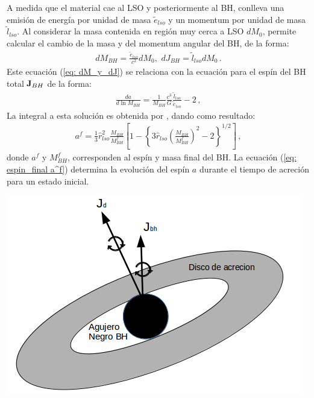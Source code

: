 A medida que el material cae al LSO y posteriormente al BH, conlleva  una emisión de energía por unidad de masa $\widetilde{e}_{lso}$ y un momentum por unidad de masa $\widetilde{l}_{lso}$. Al considerar la masa contenida en región muy cerca a LSO $dM_{0}$, permite calcular el cambio de la masa y del momentum angular del BH, de la forma:
%
\begin{align}
    dM_{BH}=\frac{\widetilde{e}_{lso}}{c^{2}}dM_{0}, \, \, dJ_{BH}=\widetilde{l}_{lso}dM_{0}\,.
    \label{eq: dM_y_dJ}
\end{align}
%
Este ecuación (\ref{eq: dM_y_dJ}) se relaciona con la ecuación para el espín del BH total ${\bf{J}}_{BH}$ de la forma:
%
\begin{align}
    \frac{da}{d\ln{M_{BH}}}=\frac{1}{M_{BH}}\frac{c^{3}}{G}\frac{\widetilde{l}_{lso}}{\widetilde{e}_{lso}}-2\,,
\end{align}
%
La integral a esta solución es obtenida por \cite{bardeen1970}, dando como resultado: 
\begin{align}
    a^{f}=\frac{1}{3}\hat{r}_{lso}^{2}\frac{M_{BH}}{M_{BH}^{f}}\left[1- \left\{3\hat{r}_{lso}\left(\frac{M_{BH}}{M^{f}_{BH}} \right)^{2}-2 \right\}^{1/2} \right]\,,
    \label{eq: espin_final a^f}
\end{align}
donde $a^{f}$ y $M_{BH}^{f}$, corresponden al espín y masa final del BH. La ecuación (\ref{eq: espin_final a^f}) determina la evolución del espín $a$ durante el tiempo de acreción para un estado inicial. 

\begin{center}
\includegraphics[scale=.35]{./figures/4_Modelo_Spin/Modelo_disco_bh.png}
\label{fig: desaliniamineto_bh_disco}
\end{center}

